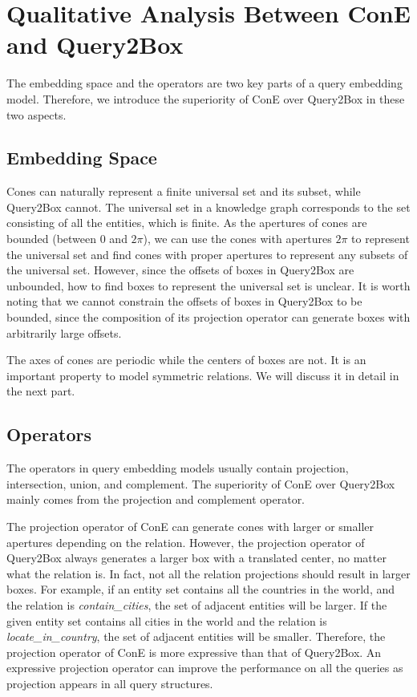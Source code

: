 \documentclass{article}
\begin{document}
\newpage
\section{Qualitative Analysis Between ConE and Query2Box}
The embedding space and the operators are two key parts of a query embedding model. Therefore, we introduce the superiority of ConE over Query2Box in these two aspects.

\subsection{Embedding Space}
Cones can naturally represent a finite universal set and its subset, while Query2Box cannot. The universal set in a knowledge graph corresponds to the set consisting of all the entities, which is finite. As the apertures of cones are bounded (between $0$ and $2\pi$), we can use the cones with apertures $2\pi$ to represent the universal set and find cones with proper apertures to represent any subsets of the universal set. However, since the offsets of boxes in Query2Box are unbounded, how to find boxes to represent the universal set is unclear. It is worth noting that we cannot constrain the offsets of boxes in Query2Box to be bounded, since the composition of its projection operator can generate boxes with arbitrarily large offsets.

The axes of cones are periodic while the centers of boxes are not. It is an important property to model symmetric relations. We will discuss it in detail in the next part.

\subsection{Operators}
The operators in query embedding models usually contain projection, intersection, union, and complement.  The superiority of ConE over Query2Box mainly comes from the projection and complement operator.

The projection operator of ConE can generate cones with larger or smaller apertures depending on the relation. However, the projection operator of Query2Box always generates a larger box with a translated center, no matter what the relation is.  In fact, not all the relation projections should result in larger boxes. For example, if an entity set contains all the countries in the world, and the relation is \textit{contain\_cities}, the set of adjacent entities will be larger. If the given entity set contains all cities in the world and the relation is \textit{locate\_in\_country}, the set of adjacent entities will be smaller. Therefore, the projection operator of ConE is more expressive than that of Query2Box. An expressive projection operator can improve the performance on all the queries as projection appears in all query structures. 
\end{document}
